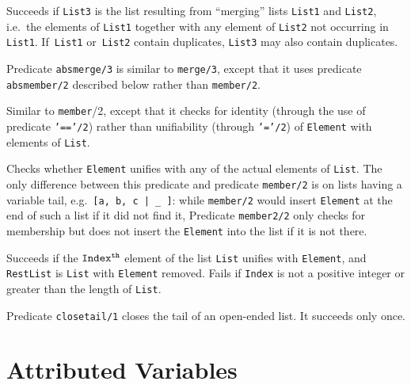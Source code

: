 \begin{description}
    Succeeds if {\tt List3} is the list resulting from ``merging'' lists 
    {\tt List1} and {\tt List2},
    i.e.\ the elements of {\tt List1} together with any element of 
    {\tt List2} not occurring in {\tt List1}.
    If~{\tt List1} or~{\tt List2} contain duplicates, {\tt List3} may 
    also contain duplicates.

    Predicate {\tt absmerge/3} is similar to {\tt merge/3}, except that 
    it uses predicate {\tt absmember/2} described below rather than 
    {\tt member/2}.

    Similar to {\tt member}/2, except that it checks for identity
    (through the use of predicate {\tt '=='/2}) rather than unifiability 
    (through {\tt '='/2}) of {\tt Element} with elements of {\tt List}.

    Checks whether {\tt Element} unifies with any of the actual elements 
    of {\tt List}.  The only difference between this predicate and 
    predicate {\tt member/2} is on lists having a variable tail, 
    e.g.\ \verb'[a, b, c | _ ]': while {\tt member/2} would insert 
    {\tt Element} at the end of such a list if it did not find it, 
    Predicate {\tt member2/2} only checks for membership but does not 
    insert the {\tt Element} into the list if it is not there.

    Succeeds if the ${\tt Index^{th}}$ element of the list {\tt List}
    unifies with {\tt Element}, and {\tt RestList} is {\tt List} with
    {\tt Element} removed.  Fails if {\tt Index} is not a positive
    integer or greater than the length of {\tt List}.

    Predicate {\tt closetail/1} closes the tail of an open-ended list.
    It succeeds only once.

\end{description}


\section{Attributed Variables}

